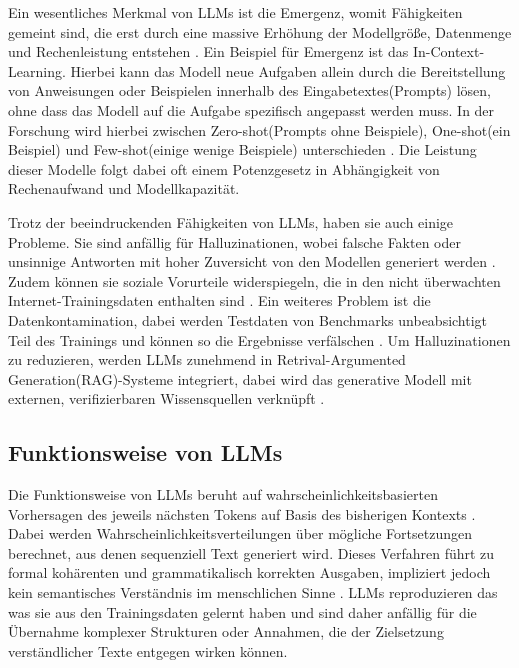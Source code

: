 Ein wesentliches Merkmal von LLMs ist die Emergenz, womit Fähigkeiten gemeint sind, die erst durch eine massive Erhöhung der Modellgröße, Datenmenge und Rechenleistung entstehen \cite[S.1]{bommasani_opportunities_2022}.
Ein Beispiel für Emergenz ist das In-Context-Learning.
Hierbei kann das Modell neue Aufgaben allein durch die Bereitstellung von Anweisungen oder Beispielen innerhalb des Eingabetextes(Prompts) lösen, ohne dass das Modell auf die Aufgabe spezifisch angepasst werden muss.
In der Forschung wird hierbei zwischen Zero-shot(Prompts ohne Beispiele), One-shot(ein Beispiel) und Few-shot(einige wenige Beispiele) unterschieden \cite[S. 3-6]{brown_language_2020}.
Die Leistung dieser Modelle folgt dabei oft einem Potenzgesetz in Abhängigkeit von Rechenaufwand und Modellkapazität.

Trotz der beeindruckenden Fähigkeiten von LLMs, haben sie auch einige Probleme.
Sie sind anfällig für Halluzinationen, wobei falsche Fakten oder unsinnige Antworten mit hoher Zuversicht von den Modellen generiert werden \cite[S. 1]{wu_clasheval_2025}.
Zudem können sie soziale Vorurteile widerspiegeln, die in den nicht überwachten Internet-Trainingsdaten enthalten sind \cite[S. 36]{brown_language_2020}.
Ein weiteres Problem ist die Datenkontamination, dabei werden Testdaten von Benchmarks unbeabsichtigt Teil des Trainings und können so die Ergebnisse verfälschen \cite[S. 6]{brown_language_2020}.
Um Halluzinationen zu reduzieren, werden LLMs zunehmend in Retrival-Argumented Generation(RAG)-Systeme integriert, dabei wird das generative Modell mit externen, verifizierbaren Wissensquellen verknüpft \cite[S. 1]{wu_clasheval_2025}.

\subsection{Funktionsweise von LLMs}
Die Funktionsweise von LLMs beruht auf wahrscheinlichkeitsbasierten Vorhersagen des jeweils nächsten Tokens auf Basis des bisherigen Kontexts \cite[S. 6]{xiao_foundations_2025}. Dabei werden Wahrscheinlichkeitsverteilungen über mögliche Fortsetzungen berechnet, aus denen sequenziell Text generiert wird. Dieses Verfahren führt zu formal kohärenten und grammatikalisch korrekten Ausgaben, impliziert jedoch kein semantisches Verständnis im menschlichen Sinne \cite[S. 230]{bluthgen_technische_2025}.
LLMs reproduzieren das was sie aus den Trainingsdaten gelernt haben und sind daher anfällig für die Übernahme komplexer Strukturen oder Annahmen, die der Zielsetzung verständlicher Texte entgegen wirken können.

